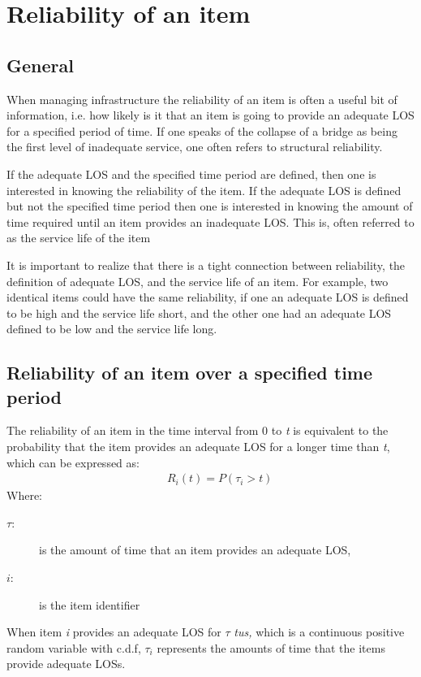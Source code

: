 \section{Reliability of an item}
\subsection{General}
When managing infrastructure the reliability of an item is often a useful bit of
information, i.e. how likely is it that an item is going to provide an adequate
LOS for a specified period of time. If one speaks of the collapse of a bridge as
being the first level of inadequate service, one often refers to structural
reliability.

If the adequate LOS and the specified time period are defined, then one is
interested in knowing the reliability of the item. If the adequate LOS is defined
but not the specified time period then one is interested in knowing the amount of
time required until an item provides an inadequate LOS. This is, often referred
to as the service life of the item

It is important to realize that there is a tight connection between reliability,
the definition of adequate LOS, and the service life of an item. For example, two
identical items could have the same reliability, if one an adequate LOS is
defined to be high and the service life short, and the other one had an adequate
LOS defined to be low and the service life long.
\subsection{Reliability of an item over a specified time period}
The reliability of an item in the time interval from 0 to \textit{t} is
equivalent to the probability that the item provides an adequate LOS for a longer
time than \textit{t}, which can be expressed as:
\begin{eqnarray}
&& {R_i}\left( t \right) = P\left( {{\tau _i} > t} \right)
\label{eqreliability:1}
\end{eqnarray}
Where:
\begin{adjustwidth}{1cm}{}
\begin{description}
\item[$\tau$:] is the amount of time that an item provides an adequate LOS,
\item[$i$:] is the item identifier
\end{description}
\end{adjustwidth}
When item \textit{i} provides an adequate LOS for $\tau $ \textit{tus,} which is
a continuous positive random variable with c.d.f, ${\tau _i}$ represents the
amounts of time that the items provide adequate LOSs.

